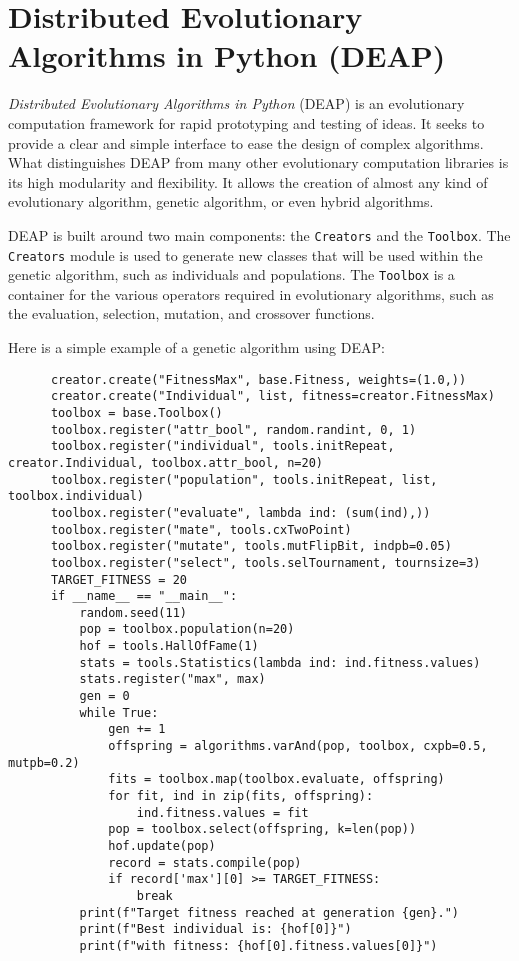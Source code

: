 \section{Distributed Evolutionary Algorithms in Python (DEAP)}
\label{sec:sota:deap}

  \emph{Distributed Evolutionary Algorithms in Python} (DEAP) is an evolutionary
  computation framework for rapid prototyping and testing of ideas.
  It seeks to provide a clear and simple interface to ease the design of complex
  algorithms.
  What distinguishes DEAP from many other evolutionary computation libraries is
  its high modularity and flexibility.
  It allows the creation of almost any kind of evolutionary algorithm, genetic
  algorithm, or even hybrid algorithms.

  DEAP is built around two main components: the \texttt{Creators} and the
  \texttt{Toolbox}.
  The \texttt{Creators} module is used to generate new classes that will be used
  within the genetic algorithm, such as individuals and populations.
  The \texttt{Toolbox} is a container for the various operators required in
  evolutionary algorithms, such as the evaluation, selection, mutation, and
  crossover functions.

  Here is a simple example of a genetic algorithm using DEAP:

  \begin{src}
    \label{src:sota:deap:example}
    \begin{verbatim}
      creator.create("FitnessMax", base.Fitness, weights=(1.0,))
      creator.create("Individual", list, fitness=creator.FitnessMax)
      toolbox = base.Toolbox()
      toolbox.register("attr_bool", random.randint, 0, 1)
      toolbox.register("individual", tools.initRepeat, creator.Individual, toolbox.attr_bool, n=20)
      toolbox.register("population", tools.initRepeat, list, toolbox.individual)
      toolbox.register("evaluate", lambda ind: (sum(ind),))
      toolbox.register("mate", tools.cxTwoPoint)
      toolbox.register("mutate", tools.mutFlipBit, indpb=0.05)
      toolbox.register("select", tools.selTournament, tournsize=3)
      TARGET_FITNESS = 20
      if __name__ == "__main__":
          random.seed(11)
          pop = toolbox.population(n=20)
          hof = tools.HallOfFame(1)
          stats = tools.Statistics(lambda ind: ind.fitness.values)
          stats.register("max", max)
          gen = 0
          while True:
              gen += 1
              offspring = algorithms.varAnd(pop, toolbox, cxpb=0.5, mutpb=0.2)
              fits = toolbox.map(toolbox.evaluate, offspring)
              for fit, ind in zip(fits, offspring):
                  ind.fitness.values = fit
              pop = toolbox.select(offspring, k=len(pop))
              hof.update(pop)
              record = stats.compile(pop)
              if record['max'][0] >= TARGET_FITNESS:
                  break
          print(f"Target fitness reached at generation {gen}.")
          print(f"Best individual is: {hof[0]}")
          print(f"with fitness: {hof[0].fitness.values[0]}")
    \end{verbatim}
  \end{src}

